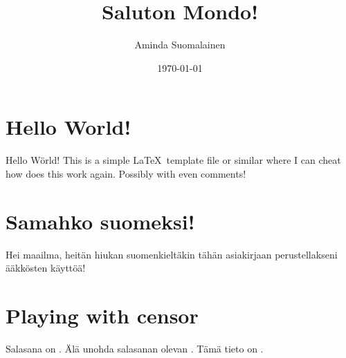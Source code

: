 \documentclass[a4paper,12pt]{artikel3}
\title{Saluton Mondo!}
\author{Aminda Suomalainen}
\date{\today}
\begin{document}
\maketitle

\section*{Hello World!}

Hello Wörld! This is a simple \LaTeX\ template file or similar where I can
cheat how does this work again. Possibly with even comments!

\section*{Samahko suomeksi!}

Hei maailma, heitän hiukan suomenkieltäkin tähän asiakirjaan perustellakseni
ääkkösten käyttöä!

\section*{Playing with censor}


\def \Password{}
\def \Huippusalainen{\censor*{14}}

Salasana on \Password. Älä unohda salasanan olevan \Password. Tämä tieto on \Huippusalainen.

\end{document}
